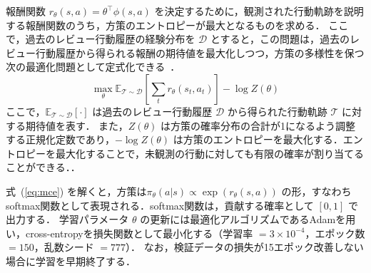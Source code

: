 \documentclass[submit,noauthor,ses,dvipdfmx]{ipsj}
\begin{document}
報酬関数 $r_\theta(s,a) = \theta^\top \phi(s,a)$ を決定するために，観測された行動軌跡を説明する報酬関数のうち，方策のエントロピーが最大となるものを求める．
ここで，過去のレビュー行動履歴の経験分布を $\mathcal{D}$ とすると，この問題は，過去のレビュー行動履歴から得られる報酬の期待値を最大化しつつ，方策の多様性を保つ次の最適化問題として定式化できる~\cite{ziebart}．
\begin{equation}
\max_\theta \mathbb{E}_{\mathcal{T} \sim \mathcal{D}}
\left[\sum_t r_\theta(s_t, a_t)\right] - \log Z(\theta)
\label{eq:mce}
\end{equation}
ここで，$\mathbb{E}_{\mathcal{T} \sim \mathcal{D}}[\cdot]$ は過去のレビュー行動履歴 $\mathcal{D}$ から得られた行動軌跡 $\mathcal{T}$ に対する期待値を表す．
また，$Z(\theta)$ は方策の確率分布の合計が1になるよう調整する正規化定数であり，$-\log Z(\theta)$ は方策のエントロピーを最大化する．エントロピーを最大化することで，未観測の行動に対しても有限の確率が割り当てることができる．．

式~(\ref{eq:mce}) を解くと，方策は$\pi_\theta(a|s) \propto \exp(r_\theta(s,a))$ の形，すなわちsoftmax関数として表現される．softmax関数は，貢献する確率として $[0, 1]$ で出力する．
学習パラメータ $\theta$ の更新には最適化アルゴリズムであるAdam\cite{adam}を用い，cross-entropyを損失関数として最小化する（学習率 $= 3\times10^{-4}$，エポック数 $= 150$，乱数シード $= 777$）．
なお，検証データの損失が15エポック改善しない場合に学習を早期終了する．







\end{document}
